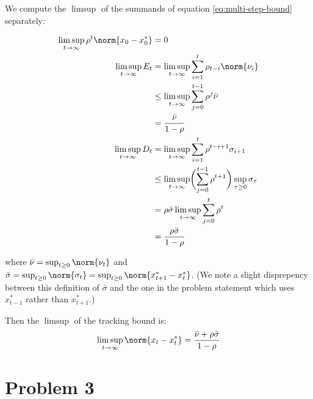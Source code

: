 \documentclass{homework}
\begin{document}
\begin{letterenum}
\item We compute the $\limsup$ of the summands of equation \ref{eq:multi-step-bound}
separately:

\begin{align*}
    \limsup_{t\to\infty} \rho^t \norm{x_0 - x_0^*} &= 0 \\
    \limsup_{t\to\infty} E_t &=
        \limsup_{t\to\infty} \sum_{i=1}^t \rho_{t-i} \norm{\nu_i} \\
        &\leq \limsup_{t\to\infty} \sum_{j=0}^{t-1} \rho^j \bar{\nu} \\
        &= \frac{\bar{\nu}}{1-\rho} \\
    \limsup_{t\to\infty} D_t &=
        \limsup_{t\to\infty} \sum_{i=1}^{t} \rho^{t-i+1} \sigma_{i+1} \\
        &\leq \limsup_{t\to\infty} \biggl(
            \sum_{j=0}^{t-1} \rho^{t+1}
        \biggr) \sup_{\tau \geq 0} \sigma_\tau \\
        &= \rho \bar{\sigma} \limsup_{t\to\infty} \sum_{j=0}^{t} \rho^t \\
        &= \frac{\rho \bar{\sigma}}{1 - \rho}
\end{align*}

where $\bar{\nu} = \sup_{t \geq 0} \norm{\nu_t}$ and
$\bar{\sigma} = \sup_{t \geq 0} \norm{\sigma_t} =
\sup_{t \geq 0} \norm{x_{t+1}^* - x_t^*}$. (We note a slight disprepency between
this definition of $\bar{\sigma}$ and the one in the problem statement which uses
$x_{t-1}^*$ rather than $x_{t+1}^*$.)

Then the $\limsup$ of the tracking bound is:
\begin{equation*}
    \limsup_{t\to\infty} \norm{x_t - x_t^*} =
        \frac{\bar{\nu} + \rho \bar{\sigma}}{1 - \rho}
\end{equation*}
\end{letterenum}

\section{Problem 3}
\end{document}
